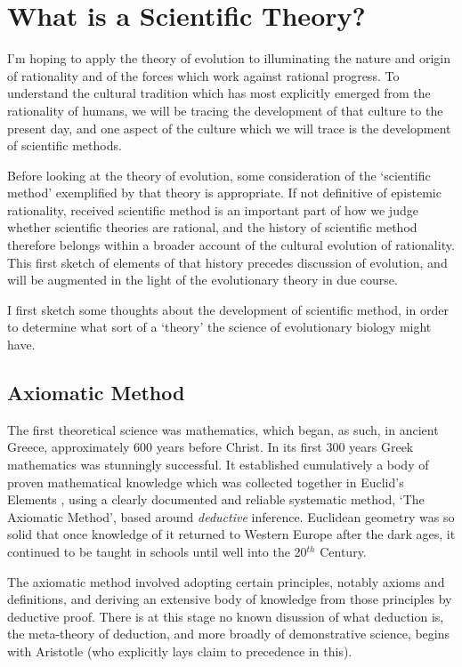 \documentclass[10pt,titlepage]{book}
\begin{document}
\section{What is a Scientific Theory?}


I'm hoping to apply the theory of evolution to illuminating the nature and origin of rationality and of the forces which work against rational progress.
To understand the cultural tradition which has most explicitly emerged from the rationality of humans, we will be tracing the development of that culture to the present day, and one aspect of the culture which we will trace is the development of scientific methods.

Before looking at the theory of evolution, some consideration of the `scientific method' exemplified by that theory is appropriate.
If not definitive of epistemic rationality, received scientific method is an important part of how we judge whether scientific theories are rational, and the history of scientific method therefore belongs within a broader account of the cultural evolution of rationality.
This first sketch of elements of that history precedes discussion of evolution, and will be augmented in the light of the evolutionary theory in due course.

I first sketch some thoughts about the development of scientific method, in order to determine what sort of a `theory' the science of evolutionary biology might have.

\subsection{Axiomatic Method}

The first theoretical science was mathematics, which began, as such, in ancient Greece, approximately 600 years before Christ.
In its first 300 years Greek mathematics was stunningly successful.
It established cumulatively a body of proven mathematical knowledge which was collected together in Euclid's Elements \cite{euclidEL1}, using a clearly documented and reliable systematic method, `The Axiomatic Method', based around \emph{deductive} inference.
Euclidean geometry was so solid that once knowledge of it returned to Western Europe after the dark ages, it continued to be taught in schools until well into the 20$^{th}$ Century.

The axiomatic method involved adopting certain principles, notably axioms and definitions, and deriving an extensive body of knowledge from those principles by deductive proof.
There is at this stage no known disussion of what deduction is, the meta-theory of deduction, and more broadly of demonstrative science, begins with Aristotle (who explicitly lays claim to precedence in this).
\end{document}
